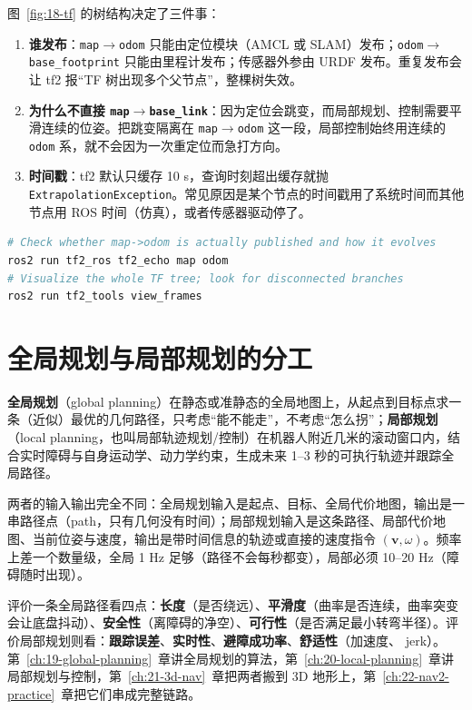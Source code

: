 图~\ref{fig:18-tf} 的树结构决定了三件事：

\begin{enumerate}
  \item \textbf{谁发布}：\texttt{map}$\to$\texttt{odom} 只能由定位模块（AMCL 或 SLAM）发布；\texttt{odom}$\to$\texttt{base\_footprint} 只能由里程计发布；传感器外参由 URDF 发布。重复发布会让 tf2 报“TF 树出现多个父节点”，整棵树失效。
  \item \textbf{为什么不直接 \texttt{map}$\to$\texttt{base\_link}}：因为定位会跳变，而局部规划、控制需要平滑连续的位姿。把跳变隔离在 \texttt{map}$\to$\texttt{odom} 这一段，局部控制始终用连续的 \texttt{odom} 系，就不会因为一次重定位而急打方向。
  \item \textbf{时间戳}：tf2 默认只缓存 10 s，查询时刻超出缓存就抛 \texttt{ExtrapolationException}。常见原因是某个节点的时间戳用了系统时间而其他节点用 ROS 时间（仿真），或者传感器驱动停了。
\end{enumerate}

\begin{lstlisting}[language=bash]
# Check whether map->odom is actually published and how it evolves
ros2 run tf2_ros tf2_echo map odom
# Visualize the whole TF tree; look for disconnected branches
ros2 run tf2_tools view_frames
\end{lstlisting}

\section{全局规划与局部规划的分工}\label{sec:18-global-local}

\begin{definition}[全局规划与局部规划]
\textbf{全局规划}（global planning）在静态或准静态的全局地图上，从起点到目标点求一条（近似）最优的几何路径，只考虑“能不能走”，不考虑“怎么拐”；\textbf{局部规划}（local planning，也叫局部轨迹规划/控制）在机器人附近几米的滚动窗口内，结合实时障碍与自身运动学、动力学约束，生成未来 1--3 秒的可执行轨迹并跟踪全局路径。
\end{definition}

两者的输入输出完全不同：全局规划输入是起点、目标、全局代价地图，输出是一串路径点（path，只有几何没有时间）；局部规划输入是这条路径、局部代价地图、当前位姿与速度，输出是带时间信息的轨迹或直接的速度指令 $(\bm{v},\omega)$。频率上差一个数量级，全局 1 Hz 足够（路径不会每秒都变），局部必须 10--20 Hz（障碍随时出现）。

评价一条全局路径看四点：\textbf{长度}（是否绕远）、\textbf{平滑度}（曲率是否连续，曲率突变会让底盘抖动）、\textbf{安全性}（离障碍的净空）、\textbf{可行性}（是否满足最小转弯半径）。评价局部规划则看：\textbf{跟踪误差}、\textbf{实时性}、\textbf{避障成功率}、\textbf{舒适性}（加速度、 jerk）。第~\ref{ch:19-global-planning}~章讲全局规划的算法，第~\ref{ch:20-local-planning}~章讲局部规划与控制，第~\ref{ch:21-3d-nav}~章把两者搬到 3D 地形上，第~\ref{ch:22-nav2-practice}~章把它们串成完整链路。


